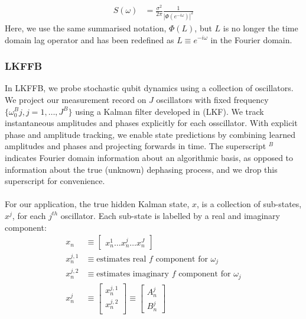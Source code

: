 \begin{align}
S(\omega) & = \frac{\sigma^2}{2 \pi }\frac{1}{|\Phi(e^{-i\omega})|^2} \label{eqn:main:ap_ssp_ar_spectden} 
\end{align}
Here, we use the same summarised notation, $\Phi(L)$, but  $L$ is no longer the time domain lag operator and has been redefined as $L \equiv e^{-i\omega}$ in the Fourier domain. 

\subsubsection{LKFFB}
In LKFFB, we probe stochastic qubit dynamics using a collection of oscillators.  We project our measurement record on $J$ oscillators with fixed frequency $\{ \omega_0^B j, j = 1, \hdots, J^B\}$ using a Kalman filter developed in \cite{livska2007} (LKF). We track instantaneous amplitudes and phases explicitly for each osscillator. With explicit phase and amplitude tracking, we enable state predictions by combining learned amplitudes and phases and projecting forwards in time. The superscript $ ^B$ indicates Fourier domain information about an algorithmic basis, as opposed to information about the true (unknown) dephasing process, and we drop this superscript for convenience.
\\
\\
For our application, the true hidden Kalman state, $x$, is a collection of sub-states, $x^j$, for each $j^{th}$ oscillator. Each sub-state is labelled by a real and imaginary component:
\begin{align}
x_n & \equiv \begin{bmatrix} x^{1}_{n} \hdots x^{j}_{n} \hdots x^{J}_{n} \end{bmatrix} \\
x^{j,1}_{n} & \equiv \text{estimates real $f$ component for $\omega_j$} \\
x^{j,2}_{n} & \equiv \text{estimates imaginary $f$ component for $\omega_j$} \\
x^j_n &\equiv \begin{bmatrix} x^{j,1}_{n} \\ x^{j,2}_{n} \\ \end{bmatrix} \equiv \begin{bmatrix} A^j_{n} \\ B^j_{n}  \end{bmatrix}
\end{align} 
